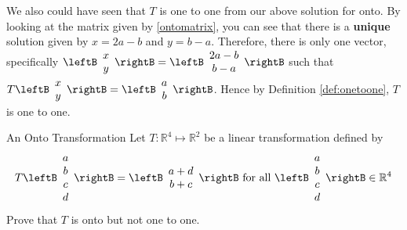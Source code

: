 \begin{solution}
We also could have seen that $T$ is one to one from our above solution for onto. By looking at the matrix given 
by \ref{ontomatrix}, you can see that there is a \textbf{unique} solution given
by $x=2a-b$ and $y=b-a$. Therefore, there
is only one vector, specifically 
$\leftB
\begin{array}{c}
x \\
y
\end{array}
\rightB
=
\leftB
\begin{array}{c}
2a-b\\
b-a
\end{array}
\rightB $ such that $T\leftB
\begin{array}{c}
x \\
y
\end{array}
\rightB =\leftB
\begin{array}{c}
a \\
b
\end{array}
\rightB $. Hence by Definition \ref{def:onetoone}, $T$ is one to one.
\end{solution}

\begin{example}{An Onto Transformation}\label{exa:ontotransformation}
Let $T: \mathbb{R}^4 \mapsto \mathbb{R}^2$ be a linear transformation defined by
\[
T \leftB \begin{array}{c}
a \\
b \\
c \\
d
\end{array}
\rightB = 
\leftB \begin{array}{c}
a + d \\
b + c 
\end{array}
\rightB
\mbox{ for all } \leftB \begin{array}{c}
a \\
b \\
c \\
d
\end{array}
\rightB \in \mathbb{R}^4
\]
Prove that $T$ is onto but not one to one.
\end{example}

